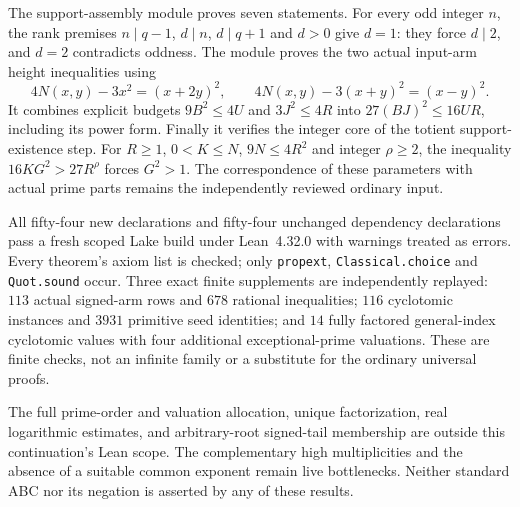 The support-assembly module proves seven statements. For every odd integer
$n$, the rank premises $n\mid q-1$, $d\mid n$, $d\mid q+1$ and
$d>0$ give $d=1$: they force $d\mid2$, and $d=2$ contradicts oddness.
The module proves the two actual input-arm height inequalities using
\[
 4N(x,y)-3x^2=(x+2y)^2,\qquad
 4N(x,y)-3(x+y)^2=(x-y)^2.
\]
It combines explicit budgets $9B^2\le4U$ and $3J^2\le4R$ into
$27(BJ)^2\le16UR$, including its power form. Finally it verifies the
integer core of the totient support-existence step. For $R\ge1$,
$0<K\le N$, $9N\le4R^2$ and integer $\rho\ge2$, the inequality
$16KG^2>27R^\rho$ forces $G^2>1$.
The correspondence of these parameters with actual prime parts remains
the independently reviewed ordinary input.

All fifty-four new declarations and fifty-four unchanged dependency
declarations pass a fresh scoped Lake build under Lean~4.32.0 with warnings
treated as errors. Every theorem's axiom list is checked; only
\texttt{propext}, \texttt{Classical.choice} and \texttt{Quot.sound} occur.
Three exact finite supplements are independently replayed: $113$ actual
signed-arm rows and $678$ rational inequalities; $116$ cyclotomic instances
and $3931$ primitive seed identities; and $14$ fully factored general-index
cyclotomic values with four additional exceptional-prime valuations.
These are finite checks, not an infinite family or a substitute for the
ordinary universal proofs.

The full prime-order and valuation allocation, unique factorization, real
logarithmic estimates, and arbitrary-root signed-tail membership are outside
this continuation's Lean scope. The complementary high multiplicities and
the absence of a suitable common exponent remain live bottlenecks. Neither
standard ABC nor its negation is asserted by any of these results.
